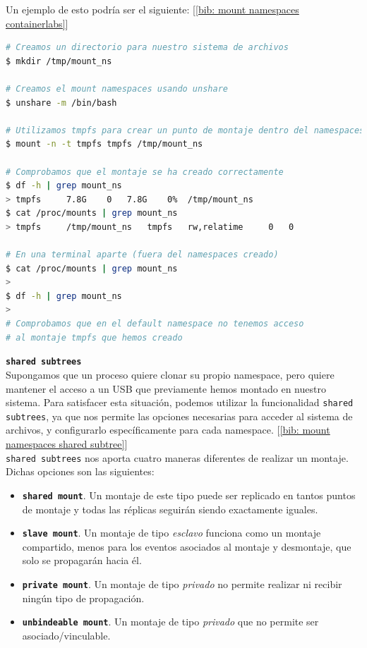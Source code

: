 \documentclass[12pt]{article}
\begin{document}
	\noindent Un ejemplo de esto podría ser el siguiente: [\ref{bib: mount namespaces containerlabs}]
	\begin{lstlisting}[language=bash, caption={Uso de \texttt{mount namespaces} con ``tmpfs''}]
# Creamos un directorio para nuestro sistema de archivos
$ mkdir /tmp/mount_ns

# Creamos el mount namespaces usando unshare
$ unshare -m /bin/bash

# Utilizamos tmpfs para crear un punto de montaje dentro del namespaces
$ mount -n -t tmpfs tmpfs /tmp/mount_ns

# Comprobamos que el montaje se ha creado correctamente
$ df -h | grep mount_ns
> tmpfs		7.8G	0	7.8G	0%	/tmp/mount_ns
$ cat /proc/mounts | grep mount_ns
> tmpfs		/tmp/mount_ns	tmpfs	rw,relatime		0	0

# En una terminal aparte (fuera del namespaces creado)
$ cat /proc/mounts | grep mount_ns
>
$ df -h | grep mount_ns
>
# Comprobamos que en el default namespace no tenemos acceso 
# al montaje tmpfs que hemos creado
	\end{lstlisting}
	
	
	\pagebreak
	
	\noindent \textbf{\large \texttt{shared subtrees}}\\
	
	\noindent Supongamos que un proceso quiere clonar su propio namespace, pero quiere mantener el acceso a un USB que previamente hemos montado en nuestro sistema. Para satisfacer esta situación, podemos utilizar la funcionalidad \texttt{shared subtrees}, ya que nos permite las opciones necesarias para acceder al sistema de archivos, y configurarlo específicamente para cada namespace. [\ref{bib: mount namespaces shared subtree}] \\
	
	\noindent \texttt{shared subtrees} nos aporta cuatro maneras diferentes de realizar un montaje. Dichas opciones son las siguientes:
	\begin{itemize}
		\item \textbf{\texttt{shared mount}}. Un montaje de este tipo puede ser replicado en tantos puntos de montaje y todas las réplicas seguirán siendo exactamente iguales.
		\item \textbf{\texttt{slave mount}}. Un montaje de tipo \textit{esclavo} funciona como un montaje compartido, menos para los eventos asociados al montaje y desmontaje, que solo se propagarán hacia él.
		\item \textbf{\texttt{private mount}}. Un montaje de tipo \textit{privado} no permite realizar ni recibir ningún tipo de propagación.
		\item \textbf{\texttt{unbindeable mount}}. Un montaje de tipo \textit{privado} que no permite ser asociado/vinculable.
	\end{itemize}
\end{document}
